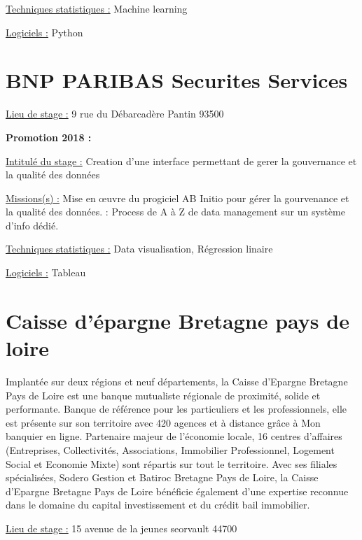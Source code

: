 \documentclass[
  letterpaper,
  DIV=11,
  numbers=noendperiod]{scrreprt}
\begin{document}
\uline{Techniques statistiques :} Machine learning

\uline{Logiciels :} Python

\hypertarget{bnp-paribas-securites-services}{%
\section{\texorpdfstring{\textbf{BNP PARIBAS Securites
Services}}{BNP PARIBAS Securites Services}}\label{bnp-paribas-securites-services}}

\uline{Lieu de stage :} 9 rue du Débarcadère Pantin 93500

\textbf{Promotion 2018 :}

\uline{Intitulé du stage :} Creation d'une interface permettant de gerer
la gouvernance et la qualité des données

\uline{Missions(s) :} Mise en œuvre du progiciel AB Initio pour gérer la
gourvenance et la qualité des données. : Process de A à Z de data
management sur un système d'info dédié.

\uline{Techniques statistiques :} Data visualisation, Régression linaire

\uline{Logiciels :} Tableau

\hypertarget{caisse-duxe9pargne-bretagne-pays-de-loire}{%
\section{\texorpdfstring{\textbf{Caisse d'épargne Bretagne pays de
loire}}{Caisse d'épargne Bretagne pays de loire}}\label{caisse-duxe9pargne-bretagne-pays-de-loire}}

Implantée sur deux régions et neuf départements, la Caisse d'Epargne
Bretagne Pays de Loire est une banque mutualiste régionale de proximité,
solide et performante. Banque de référence pour les particuliers et les
professionnels, elle est présente sur son territoire avec 420 agences et
à distance grâce à Mon banquier en ligne. Partenaire majeur de
l'économie locale, 16 centres d'affaires (Entreprises, Collectivités,
Associations, Immobilier Professionnel, Logement Social et Economie
Mixte) sont répartis sur tout le territoire. Avec ses filiales
spécialisées, Sodero Gestion et Batiroc Bretagne Pays de Loire, la
Caisse d'Epargne Bretagne Pays de Loire bénéficie également d'une
expertise reconnue dans le domaine du capital investissement et du
crédit bail immobilier.

\uline{Lieu de stage :} 15 avenue de la jeunes seorvault 44700
\end{document}
